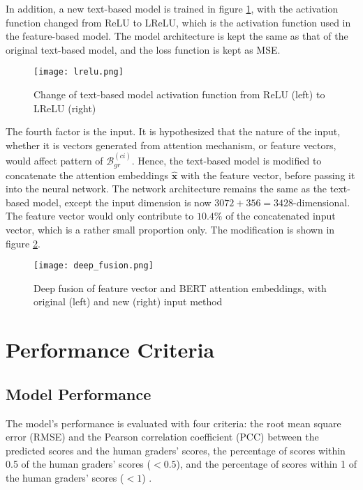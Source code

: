 In addition, a new text-based model is trained in figure \ref{fig:lrelu}, with the activation function changed from ReLU to LReLU, which is the activation function used in the feature-based model. The model architecture is kept the same as that of the original text-based model, and the loss function is kept as MSE.

\begin{figure}[H]
    \centering
    \texttt{[image: lrelu.png]}
    \caption{Change of text-based model activation function from ReLU (left) to LReLU (right)}
    \label{fig:lrelu}
\end{figure}

The fourth factor is the input. It is hypothesized that the nature of the input, whether it is vectors generated from attention mechanism, or feature vectors, would affect pattern of $\mathcal{B}^{(ci)}_{gr}$. Hence, the text-based model is modified to concatenate the attention embeddings $\mathbf{\hat{x}}$ with the feature vector, before passing it into the neural network. The network architecture remains the same as the text-based model, except the input dimension is now $3072 + 356 = 3428$-dimensional. The feature vector would only contribute to $10.4\%$ of the concatenated input vector, which is a rather small proportion only. The modification is shown in figure \ref{fig:deep_fusion}.

\begin{figure}[H]
    \centering
    \texttt{[image: deep\_fusion.png]}
    \caption{Deep fusion of feature vector and BERT attention embeddings, with original (left) and new (right) input method}
    \label{fig:deep_fusion}
\end{figure}

\section{Performance Criteria} \label{sec:performance_criteria}
\subsection{Model Performance}
The model's performance is evaluated with four criteria: the root mean square error (RMSE) and the Pearson correlation coefficient (PCC)  between the predicted scores and the human graders' scores, the percentage of scores within 0.5 of the human graders' scores ($< 0.5$),   and the percentage of scores within 1 of the human graders' scores ($< 1$) .

